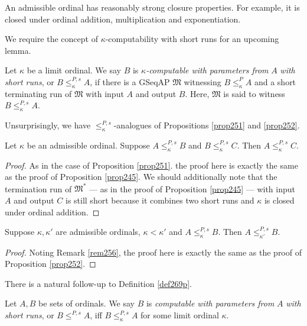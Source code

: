 \documentclass[12pt]{article}
\numberwithin{equation}{section}
\begin{document}
An admissible ordinal has reasonably strong closure properties. For example, it is closed under ordinal addition, multiplication and exponentiation.

We require the concept of $\kappa$-computability with short runs for an upcoming lemma.

\begin{defi}\label{def269p}
Let $\kappa$ be a limit ordinal. We say $B$ is $\kappa$\emph{-computable with parameters from} $A$ \emph{with short runs}, or $B \leq^{P, s}_{\kappa} A$, if there is a GSeqAP $\mathfrak{M}$ witnessing $B \leq^P_{\kappa} A$ and a short terminating run of $\mathfrak{M}$ with input $A$ and output $B$. Here, $\mathfrak{M}$ is said to witness $B \leq^{P, s}_{\kappa} A$.
\end{defi}

Unsurprisingly, we have $\leq^{P, s}_{\kappa}$-analogues of Propositions \ref{prop251} and \ref{prop252}.

\begin{prop}\label{prop270n}
Let $\kappa$ be an admissible ordinal. Suppose $A \leq^{P, s}_{\kappa} B$ and $B \leq^{P, s}_{\kappa} C$. Then $A \leq^{P, s}_{\kappa} C$.
\end{prop}

\begin{proof}
As in the case of Proposition \ref{prop251}. the proof here is exactly the same as the proof of Proposition \ref{prop245}. We should additionally note that the termination run of $\mathfrak{M}^*$ --- as in the proof of Proposition \ref{prop245} --- with input $A$ and output $C$ is still short because it combines two short runs and $\kappa$ is closed under ordinal addition.
\end{proof}

\begin{prop}\label{prop271n}
Suppose $\kappa, \kappa'$ are admissible ordinals, $\kappa < \kappa'$ and $A \leq^{P, s}_{\kappa} B$. Then $A \leq^{P, s}_{\kappa'} B$.
\end{prop}

\begin{proof}
Noting Remark \ref{rem256}, the proof here is exactly the same as the proof of Proposition \ref{prop252}.
\end{proof}

There is a natural follow-up to Definition \ref{def269p}.

\begin{defi}\label{def8329}
Let $A, B$ be sets of ordinals. We say $B$ is \emph{computable with parameters from} $A$ \emph{with short runs}, or $B \leq^{P, s} A$, iff $B \leq^{P, s}_{\kappa} A$ for some limit ordinal $\kappa$.
\end{defi}
\end{document}
